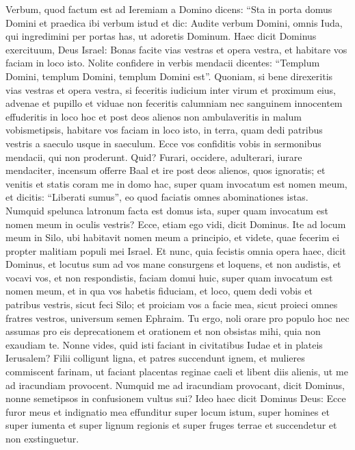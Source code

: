 \begin{biblechapter}  
\verse Verbum, quod factum est ad Ieremiam a Domino dicens: 
\verse “Sta in porta domus Domini et praedica ibi verbum istud et dic: Audite verbum Domini, omnis Iuda, qui ingredimini per portas has, ut adoretis Dominum. 
\verse Haec dicit Dominus exercituum, Deus Israel: Bonas facite vias vestras et opera vestra, et habitare vos faciam in loco isto. 
\verse Nolite confidere in verbis mendacii dicentes: “Templum Domini, templum Domini, templum Domini est”. 
\verse Quoniam, si bene direxeritis vias vestras et opera vestra, si feceritis iudicium inter virum et proximum eius, 
\verse advenae et pupillo et viduae non feceritis calumniam nec sanguinem innocentem effuderitis in loco hoc et post deos alienos non ambulaveritis in malum vobismetipsis, 
\verse habitare vos faciam in loco isto, in terra, quam dedi patribus vestris a saeculo usque in saeculum. 
\verse Ecce vos confiditis vobis in sermonibus mendacii, qui non proderunt. 
\verse Quid? Furari, occidere, adulterari, iurare mendaciter, incensum offerre Baal et ire post deos alienos, quos ignoratis; 
\verse et venitis et statis coram me in domo hac, super quam invocatum est nomen meum, et dicitis: “Liberati sumus”, eo quod faciatis omnes abominationes istas. 
\verse Numquid spelunca latronum facta est domus ista, super quam invocatum est nomen meum in oculis vestris? Ecce, etiam ego vidi, dicit Dominus. 
\verse Ite ad locum meum in Silo, ubi habitavit nomen meum a principio, et videte, quae fecerim ei propter malitiam populi mei Israel. 
\verse Et nunc, quia fecistis omnia opera haec, dicit Dominus, et locutus sum ad vos mane consurgens et loquens, et non audistis, et vocavi vos, et non respondistis, 
\verse faciam domui huic, super quam invocatum est nomen meum, et in qua vos habetis fiduciam, et loco, quem dedi vobis et patribus vestris, sicut feci Silo; 
\verse et proiciam vos a facie mea, sicut proieci omnes fratres vestros, universum semen Ephraim. 
\verse Tu ergo, noli orare pro populo hoc nec assumas pro eis deprecationem et orationem et non obsistas mihi, quia non exaudiam te. 
\verse Nonne vides, quid isti faciant in civitatibus Iudae et in plateis Ierusalem? 
\verse Filii colligunt ligna, et patres succendunt ignem, et mulieres commiscent farinam, ut faciant placentas reginae caeli et libent diis alienis, ut me ad iracundiam provocent. 
\verse Numquid me ad iracundiam provocant, dicit Dominus, nonne semetipsos in confusionem vultus sui? 
\verse Ideo haec dicit Dominus Deus: Ecce furor meus et indignatio mea effunditur super locum istum, super homines et super iumenta et super lignum regionis et super fruges terrae et succendetur et non exstinguetur. 

\end{biblechapter}
